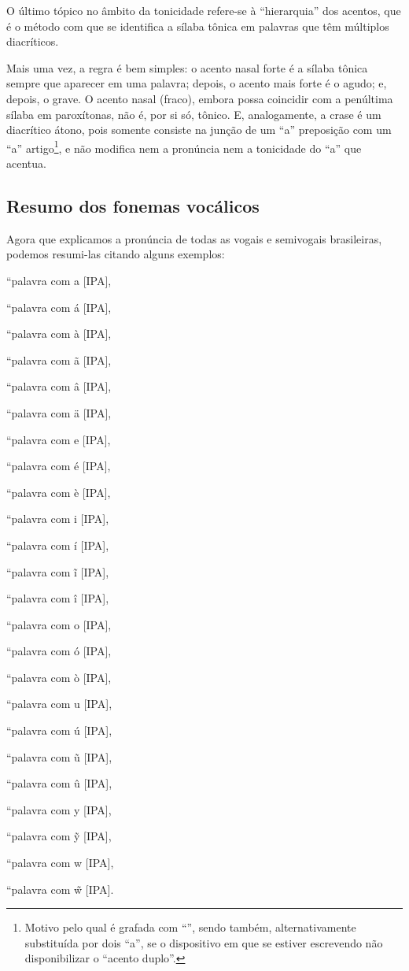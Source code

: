 \documentclass[12pt, a5paper, titlepage]{article}
\begin{document}
\begin{bilingualpages}
    O último tópico no âmbito da tonicidade refere-se à ``hierarquia'' dos acentos, que é o método com que se identifica a sílaba tônica em palavras que têm múltiplos diacríticos.
    
    Mais uma vez, a regra é bem simples: o acento nasal forte é a sílaba tônica sempre que aparecer em uma palavra; depois, o acento mais forte é o agudo; e, depois, o grave. O acento nasal (fraco), embora possa coincidir com a penúltima sílaba em paroxítonas, não é, por si só, tônico. E, analogamente, a crase é um diacrítico átono, pois somente consiste na junção de um ``a'' preposição com um ``a'' artigo\footnote{Motivo pelo qual é grafada com ``\textasciidieresis'', sendo também, alternativamente substituída por dois ``a'', se o dispositivo em que se estiver escrevendo não disponibilizar o ``acento duplo''.}, e não modifica nem a pronúncia nem a tonicidade do ``a'' que acentua.
    
    \subsection{Resumo dos fonemas vocálicos}
    Agora que explicamos a pronúncia de todas as vogais e semivogais brasileiras, podemos resumi-las citando alguns exemplos:
    \newline
    \par [não precisa de 1 exemplo por fonema vocálico]
    \par ``palavra com a [IPA],
    \par ``palavra com á [IPA],
    \par ``palavra com à [IPA],
    \par ``palavra com ã [IPA],
    \par ``palavra com â [IPA],
    \par ``palavra com ä [IPA],
    \par ``palavra com e [IPA],
    \par ``palavra com é [IPA],
    \par ``palavra com è [IPA],
    \par ``palavra com i [IPA],
    \par ``palavra com í [IPA],
    \par ``palavra com ĩ [IPA],
    \par ``palavra com î [IPA],
    \par ``palavra com o [IPA],
    \par ``palavra com ó [IPA],
    \par ``palavra com ò [IPA],
    \par ``palavra com u [IPA],
    \par ``palavra com ú [IPA],
    \par ``palavra com ũ [IPA],
    \par ``palavra com û [IPA],
    \par ``palavra com y [IPA],
    \par ``palavra com \~y [IPA],
    \par ``palavra com w [IPA],
    \par ``palavra com \~w [IPA].
    \newline


\end{bilingualpages}
\end{document}
